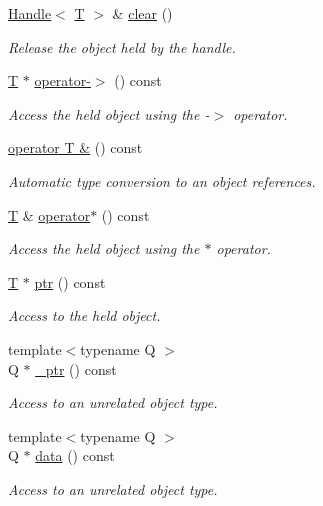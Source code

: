 \begin{DoxyCompactItemize}
\hyperlink{class_d_d4hep_1_1_handle}{Handle}$<$ \hyperlink{class_t}{T} $>$ \& \hyperlink{class_d_d4hep_1_1_handle_ad50d0ea67a1c9a4e87d232f96ebe52f1}{clear} ()
\begin{DoxyCompactList}\small\item\em Release the object held by the handle. \end{DoxyCompactList}\item 
\hyperlink{class_t}{T} $\ast$ \hyperlink{class_d_d4hep_1_1_handle_aa29c5d0668d78066a3ac9c07f08755b4}{operator-\/$>$} () const
\begin{DoxyCompactList}\small\item\em Access the held object using the -\/$>$ operator. \end{DoxyCompactList}\item 
\hyperlink{class_d_d4hep_1_1_handle_a9e2360ed8586b1a063bc1478d8cae3b7}{operator T \&} () const
\begin{DoxyCompactList}\small\item\em Automatic type conversion to an object references. \end{DoxyCompactList}\item 
\hyperlink{class_t}{T} \& \hyperlink{class_d_d4hep_1_1_handle_ac7cbc85a83d5aaa4aca1a3c0ba0e92f6}{operator$\ast$} () const
\begin{DoxyCompactList}\small\item\em Access the held object using the $\ast$ operator. \end{DoxyCompactList}\item 
\hyperlink{class_t}{T} $\ast$ \hyperlink{class_d_d4hep_1_1_handle_a6f165a9eec329d2d65172767b5f2777a}{ptr} () const
\begin{DoxyCompactList}\small\item\em Access to the held object. \end{DoxyCompactList}\item 
{\footnotesize template$<$typename Q $>$ }\\Q $\ast$ \hyperlink{class_d_d4hep_1_1_handle_ab89f950af32b485d28b14a10f2fd8173}{\+\_\+ptr} () const
\begin{DoxyCompactList}\small\item\em Access to an unrelated object type. \end{DoxyCompactList}\item 
{\footnotesize template$<$typename Q $>$ }\\Q $\ast$ \hyperlink{class_d_d4hep_1_1_handle_accccca2cf7cab5a234ab59b8b9e060a2}{data} () const
\begin{DoxyCompactList}\small\item\em Access to an unrelated object type. \end{DoxyCompactList}\item 

\end{DoxyCompactItemize}
